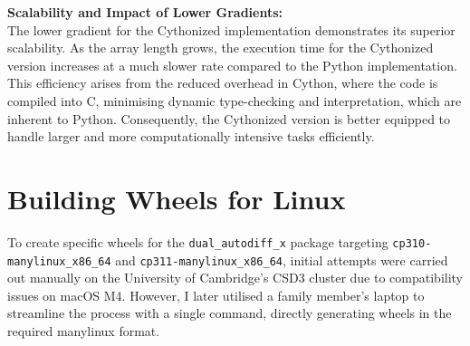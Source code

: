 \documentclass[a4paper,12pt]{article}
\begin{document}
\textbf{Scalability and Impact of Lower Gradients:} \\
The lower gradient for the Cythonized implementation demonstrates its superior scalability. As the array length grows, the execution time for the Cythonized version increases at a much slower rate compared to the Python implementation. This efficiency arises from the reduced overhead in Cython, where the code is compiled into C, minimising dynamic type-checking and interpretation, which are inherent to Python. Consequently, the Cythonized version is better equipped to handle larger and more computationally intensive tasks efficiently.

\section{Building Wheels for Linux}

To create specific wheels for the \texttt{dual\_autodiff\_x} package targeting \texttt{cp310-manylinux\_x86\_64} and \texttt{cp311-manylinux\_x86\_64}, initial attempts were carried out manually on the University of Cambridge's CSD3 cluster due to compatibility issues on macOS M4. However, I later utilised a family member's laptop to streamline the process with a single command, directly generating wheels in the required manylinux format.
\end{document}
